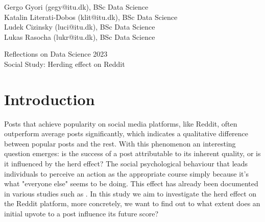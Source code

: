 \documentclass[fleqn,12pt]{article}
\begin{document}
\setlength{\baselineskip}{1.44\baselineskip}



\begin{flushleft}
  {\large Gergo Gyori (gegy@itu.dk), BSc Data Science \\
  Katalin Literati-Dobos (klit@itu.dk), BSc Data Science \\
  Ludek Cizinsky (luci@itu.dk), BSc Data Science \\
  Lukas Rasocha (lukr@itu.dk), BSc Data Science \\}
 \end{flushleft}
 
\begin{center}
  {\Large Reflections on Data Science 2023}\\[5ex]
  {\Large Social Study: Herding effect on Reddit}\\[5ex]

 \end{center}
 




\parindent=20pt 
\parskip=0mm

\section{Introduction}
Posts that achieve popularity on social media platforms, 
like Reddit, often outperform average posts significantly, 
which indicates a qualitative difference between popular posts 
and the rest. With this phenomenon an interesting question emerges:
is the success of a post attributable to its inherent quality,
or is it influenced by the herd effect? The social psychological 
behaviour that leads individuals to perceive an action as the 
appropriate course simply because it's what "everyone else" 
seems to be doing. This effect has already been documented in various studies such as \cite{muchnik} \cite{salganik}.
In this study we aim to investigate the herd effect on the Reddit platform, more
concretely, we want to find out to what extent does an initial upvote to a post
influence its future score?
\end{document}
